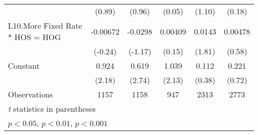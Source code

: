 {\begin{tabular}{l*{5}{c}}
                &   (0.89)         &   (0.96)         &   (0.05)         &   (1.10)         &   (0.18)         \\
[1em]
L10.More Fixed Rate * HOS = HOG& -0.00672         &  -0.0298         &  0.00409         &   0.0143         &  0.00478         \\
                &  (-0.24)         &  (-1.17)         &   (0.15)         &   (1.81)         &   (0.58)         \\
[1em]
Constant        &    0.924\sym{*}  &    0.619\sym{**} &    1.039\sym{*}  &    0.112         &    0.221         \\
                &   (2.18)         &   (2.74)         &   (2.13)         &   (0.38)         &   (0.72)         \\
\hline
Observations    &     1157         &     1158         &      947         &     2313         &     2773         \\
\hline\hline
\multicolumn{6}{l}{\footnotesize \textit{t} statistics in parentheses}\\
\multicolumn{6}{l}{\footnotesize \sym{*} \(p<0.05\), \sym{**} \(p<0.01\), \sym{***} \(p<0.001\)}\\
\end{tabular}
}
